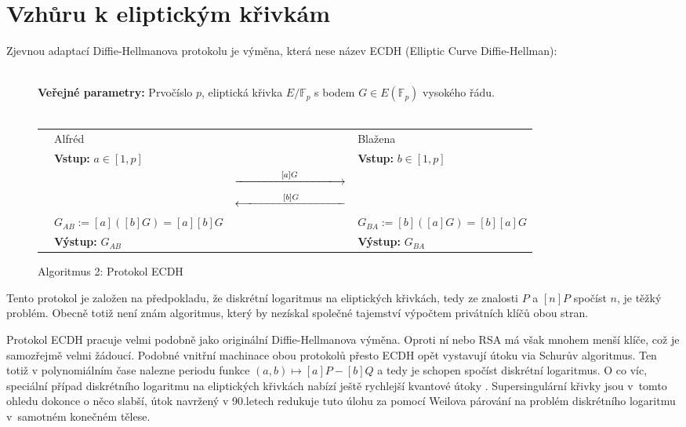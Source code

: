 \documentclass[12pt]{report}
\begin{document}
\section{Vzhůru k eliptickým křivkám}


Zjevnou adaptací Diffie-Hellmanova protokolu je výměna, která nese název ECDH (Elliptic Curve Diffie-Hellman):
\begin{figure}[h]
\begin{center} 
\makebox[1cm]{\rule{17.3cm}{0.4pt}}\\
\hspace{-1.35cm} \textbf{Veřejné parametry:} Prvočíslo $p$, eliptická křivka $E/\mathbb{F}_p$ s bodem $G \in E(\mathbb{F}_p)$ vysokého řádu.\\

\vspace{-0.25cm}
\makebox[\linewidth]{\rule{17.3cm}{0.4pt}}\\
\vspace{0.2cm}
\begin{tabular}{l l c l}
\cline{2-2} \cline{4-4} 
& Alfréd & & Blažena \\ 
\cline{2-2} \cline{4-4} 
& \textbf{Vstup:} $a \in [1,p]$ & & \textbf{Vstup:} $b\in [1,p]$ \\
 & & $ \xlongrightarrow{\qquad \qquad  [a]G \qquad \qquad}$  &  \\
&  & $\xlongleftarrow{\qquad \qquad  [b]G \qquad \qquad}$   &  \\
& $G_{AB} := [a]([b]G) = [a][b]G$ &  & $ G_{BA} := [b]([a]G) = [b][a]G$ \\
& \textbf{Výstup:} $G_{AB}$ & & \textbf{Výstup:} $G_{BA}$
\end{tabular}
\caption*{Algoritmus 2: Protokol ECDH}

\end{center}
\end{figure}

Tento protokol je založen na předpokladu, že diskrétní logaritmus na eliptických křivkách, tedy ze znalosti $P$ a $[n]P$ spočíst $n$, je těžký problém. Obecně totiž není znám algoritmus, který by nezískal společné tajemství výpočtem privátních klíčů obou stran.

Protokol ECDH pracuje velmi podobně jako originální Diffie-Hellmanova výměna. Oproti ní nebo RSA má však mnohem menší klíče, což je samozřejmě velmi žádoucí. Podobné vnitřní machinace obou protokolů přesto ECDH opět vystavují útoku via Schurův algoritmus. Ten totiž v polynomiálním čase nalezne periodu funkce $(a,b) \mapsto [a]P - [b]Q$ a tedy je schopen spočíst diskrétní logaritmus. O co víc, speciální případ diskrétního logaritmu na eliptických křivkách nabízí ještě rychlejší kvantové útoky \cite{Proos}. Supersingulární křivky jsou v~tomto ohledu dokonce o něco slabší, útok navržený v 90.letech \cite{MOV} redukuje tuto úlohu za pomocí Weilova párování na problém diskrétního logaritmu v~samotném konečném tělese.
\end{document}
